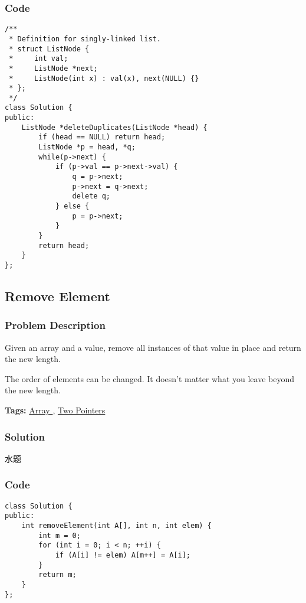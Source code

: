 \documentclass{article}
\begin{document}
\begin{CJK*}{UTF8}{gkai}
\subsubsection*{Code}
\begin{lstlisting}
/**
 * Definition for singly-linked list.
 * struct ListNode {
 *     int val;
 *     ListNode *next;
 *     ListNode(int x) : val(x), next(NULL) {}
 * };
 */
class Solution {
public:
    ListNode *deleteDuplicates(ListNode *head) {
        if (head == NULL) return head;
        ListNode *p = head, *q;
        while(p->next) {
            if (p->val == p->next->val) {
                q = p->next;
                p->next = q->next;
                delete q;
            } else {
                p = p->next;
            }
        }
        return head;
    }
}; 
\end{lstlisting}


\subsection{ Remove Element }
\label{ Remove Element }

\subsubsection*{Problem Description}
Given an array and a value, remove all instances of that value in place and return the new length.

The order of elements can be changed. It doesn't matter what you leave beyond the new length.


\textbf{Tags: }
\hyperref[ Array ]{ Array },  \hyperref[ Two Pointers ]{ Two Pointers }



\subsubsection*{Solution}
水题

\subsubsection*{Code}
\begin{lstlisting}
class Solution {
public:
    int removeElement(int A[], int n, int elem) {
        int m = 0;
        for (int i = 0; i < n; ++i) {
            if (A[i] != elem) A[m++] = A[i];
        }
        return m;
    }
}; 
\end{lstlisting}



\end{CJK*}
\end{document}
